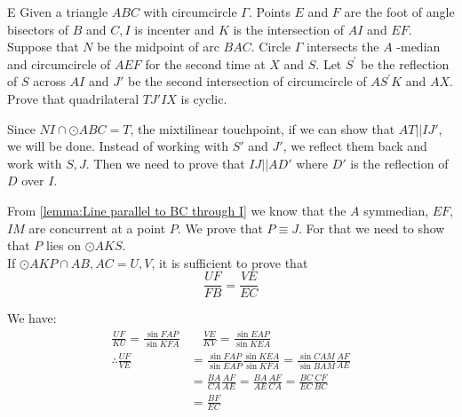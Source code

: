 



\prob{}
{}{E}{
    Given a triangle $A B C$ with circumcircle $\Gamma$. Points $E$ and $F$
    are the foot of angle bisectors of $B$ and $C, I$ is incenter and $K$ is
    the intersection of $A I$ and $E F$. Suppose that $N$ be the midpoint of
    arc $B A C$. Circle $\Gamma$ intersects the $A$ -median and circumcircle
    of $A E F$ for the second time at $X$ and $S$. Let $S^{\prime}$ be the
    reflection of $S$ across $A I$ and $J'$ be the second intersection of
    circumcircle of $A S^{\prime} K$ and $A X$. Prove that quadrilateral $T J'
    I X$ is cyclic.
}

\begin{solution}
    Since $NI\cap \odot ABC=T$, the mixtilinear touchpoint, if we can show
    that $AT||IJ'$, we will be done.  Instead of working with $S'$ and $J'$,
    we reflect them back and work with $S, J$. Then we need to prove that
    $IJ||AD'$ where $D'$ is the reflection of $D$ over $I$.


    From \autoref{lemma:Line parallel to BC through I} we know that the $A$
    symmedian, $EF$, $IM$ are concurrent at a point $P$. We prove that $P
    \equiv J$. For that we need to show that $P$ lies on $\odot AKS$.\\

    If $\odot AKP\cap AB, AC = U, V$, it is sufficient to prove that 
    \[\frac{UF}{FB} = \frac{VE}{EC}\] 
    
    We have:
    \begin{align*}
        \frac{UF}{KU} = \frac{\sin FAP}{\sin KFA} &\quad\frac{VE}{KV} =
        \frac{\sin EAP}{\sin KEA}\\[1em]
        \therefore \frac{UF}{VE} &=\frac{\sin FAP}{\sin EAP} \frac{\sin KEA}{\sin KFA}
        =\frac{\sin CAM}{\sin BAM}\frac{AF}{AE}\\[1em]
        &=\frac{BA}{CA}\frac{AF}{AE}=\frac{BA}{AE}\frac{AF}{CA}
        =\frac{BC}{EC}\frac{CF}{BC}\\[1em]
        &=\frac{BF}{EC}
    \end{align*}
\end{solution}

